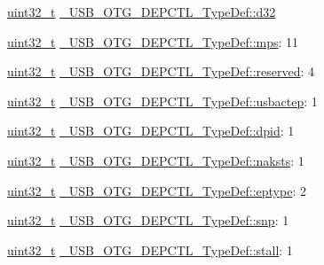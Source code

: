\begin{DoxyCompactItemize}
\begin{tabbing}
\end{tabbing}\item 
\hyperlink{stdint_8h_a435d1572bf3f880d55459d9805097f62}{uint32\-\_\-t} \hyperlink{group___u_s_b___o_t_g___d_r_i_v_e_r_ga606834f84b3675107103bc88973835cb}{\-\_\-\-U\-S\-B\-\_\-\-O\-T\-G\-\_\-\-D\-E\-P\-C\-T\-L\-\_\-\-Type\-Def\-::d32}
\item 
\hyperlink{stdint_8h_a435d1572bf3f880d55459d9805097f62}{uint32\-\_\-t} \hyperlink{group___u_s_b___o_t_g___d_r_i_v_e_r_gaee25bec8b0ce21c22dc927bc651c0bcd}{\-\_\-\-U\-S\-B\-\_\-\-O\-T\-G\-\_\-\-D\-E\-P\-C\-T\-L\-\_\-\-Type\-Def\-::mps}\-: 11
\item 
\hyperlink{stdint_8h_a435d1572bf3f880d55459d9805097f62}{uint32\-\_\-t} \hyperlink{group___u_s_b___o_t_g___d_r_i_v_e_r_ga0ba2580866ac970f191b94772a602611}{\-\_\-\-U\-S\-B\-\_\-\-O\-T\-G\-\_\-\-D\-E\-P\-C\-T\-L\-\_\-\-Type\-Def\-::reserved}\-: 4
\item 
\hyperlink{stdint_8h_a435d1572bf3f880d55459d9805097f62}{uint32\-\_\-t} \hyperlink{group___u_s_b___o_t_g___d_r_i_v_e_r_gab3805d715faba1f50520d202c9da5be0}{\-\_\-\-U\-S\-B\-\_\-\-O\-T\-G\-\_\-\-D\-E\-P\-C\-T\-L\-\_\-\-Type\-Def\-::usbactep}\-: 1
\item 
\hyperlink{stdint_8h_a435d1572bf3f880d55459d9805097f62}{uint32\-\_\-t} \hyperlink{group___u_s_b___o_t_g___d_r_i_v_e_r_gac4b8b9dfdf722dd3e1fed849bf8ea7ba}{\-\_\-\-U\-S\-B\-\_\-\-O\-T\-G\-\_\-\-D\-E\-P\-C\-T\-L\-\_\-\-Type\-Def\-::dpid}\-: 1
\item 
\hyperlink{stdint_8h_a435d1572bf3f880d55459d9805097f62}{uint32\-\_\-t} \hyperlink{group___u_s_b___o_t_g___d_r_i_v_e_r_gac13fa9b6bc3238163c2efd7df474dc04}{\-\_\-\-U\-S\-B\-\_\-\-O\-T\-G\-\_\-\-D\-E\-P\-C\-T\-L\-\_\-\-Type\-Def\-::naksts}\-: 1
\item 
\hyperlink{stdint_8h_a435d1572bf3f880d55459d9805097f62}{uint32\-\_\-t} \hyperlink{group___u_s_b___o_t_g___d_r_i_v_e_r_ga9d1e5bf3f406fb64d10b7a54a4302dcc}{\-\_\-\-U\-S\-B\-\_\-\-O\-T\-G\-\_\-\-D\-E\-P\-C\-T\-L\-\_\-\-Type\-Def\-::eptype}\-: 2
\item 
\hyperlink{stdint_8h_a435d1572bf3f880d55459d9805097f62}{uint32\-\_\-t} \hyperlink{group___u_s_b___o_t_g___d_r_i_v_e_r_ga39db95db811c1ab0d6706d1105fc1875}{\-\_\-\-U\-S\-B\-\_\-\-O\-T\-G\-\_\-\-D\-E\-P\-C\-T\-L\-\_\-\-Type\-Def\-::snp}\-: 1
\item 
\hyperlink{stdint_8h_a435d1572bf3f880d55459d9805097f62}{uint32\-\_\-t} \hyperlink{group___u_s_b___o_t_g___d_r_i_v_e_r_gac6602ddfb32c5671ed755b9b4feebb82}{\-\_\-\-U\-S\-B\-\_\-\-O\-T\-G\-\_\-\-D\-E\-P\-C\-T\-L\-\_\-\-Type\-Def\-::stall}\-: 1

\end{DoxyCompactItemize}
